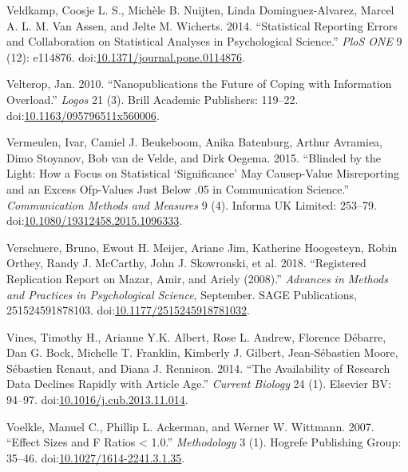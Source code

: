 \documentclass[a5paper]{book}
\begin{document}
\hypertarget{ref-doi:10.1371ux2fjournal.pone.0114876}{}
Veldkamp, Coosje L. S., Michèle B. Nuijten, Linda Dominguez-Alvarez,
Marcel A. L. M. Van Assen, and Jelte M. Wicherts. 2014. ``Statistical
Reporting Errors and Collaboration on Statistical Analyses in
Psychological Science.'' \emph{PloS ONE} 9 (12): e114876.
doi:\href{https://doi.org/10.1371/journal.pone.0114876}{10.1371/journal.pone.0114876}.

\hypertarget{ref-doi:10.1163ux2f095796511X560006}{}
Velterop, Jan. 2010. ``Nanopublications the Future of Coping with
Information Overload.'' \emph{Logos} 21 (3). Brill Academic Publishers:
119--22.
doi:\href{https://doi.org/10.1163/095796511x560006}{10.1163/095796511x560006}.

\hypertarget{ref-doi:10.1080ux2f19312458.2015.1096333}{}
Vermeulen, Ivar, Camiel J. Beukeboom, Anika Batenburg, Arthur Avramiea,
Dimo Stoyanov, Bob van de Velde, and Dirk Oegema. 2015. ``Blinded by the
Light: How a Focus on Statistical `Significance' May Causep-Value
Misreporting and an Excess Ofp-Values Just Below .05 in Communication
Science.'' \emph{Communication Methods and Measures} 9 (4). Informa UK
Limited: 253--79.
doi:\href{https://doi.org/10.1080/19312458.2015.1096333}{10.1080/19312458.2015.1096333}.

\hypertarget{ref-doi:10.1177ux2f2515245918781032}{}
Verschuere, Bruno, Ewout H. Meijer, Ariane Jim, Katherine Hoogesteyn,
Robin Orthey, Randy J. McCarthy, John J. Skowronski, et al. 2018.
``Registered Replication Report on Mazar, Amir, and Ariely (2008).''
\emph{Advances in Methods and Practices in Psychological Science},
September. SAGE Publications, 251524591878103.
doi:\href{https://doi.org/10.1177/2515245918781032}{10.1177/2515245918781032}.

\hypertarget{ref-doi:10.1016ux2fj.cub.2013.11.014}{}
Vines, Timothy H., Arianne Y.K. Albert, Rose L. Andrew, Florence
Débarre, Dan G. Bock, Michelle T. Franklin, Kimberly J. Gilbert,
Jean-Sébastien Moore, Sébastien Renaut, and Diana J. Rennison. 2014.
``The Availability of Research Data Declines Rapidly with Article Age.''
\emph{Current Biology} 24 (1). Elsevier BV: 94--97.
doi:\href{https://doi.org/10.1016/j.cub.2013.11.014}{10.1016/j.cub.2013.11.014}.

\hypertarget{ref-doi:10.1027ux2f1614-2241.3.1.35}{}
Voelkle, Manuel C., Phillip L. Ackerman, and Werner W. Wittmann. 2007.
``Effect Sizes and F Ratios \textless{} 1.0.'' \emph{Methodology} 3 (1).
Hogrefe Publishing Group: 35--46.
doi:\href{https://doi.org/10.1027/1614-2241.3.1.35}{10.1027/1614-2241.3.1.35}.
\end{document}
